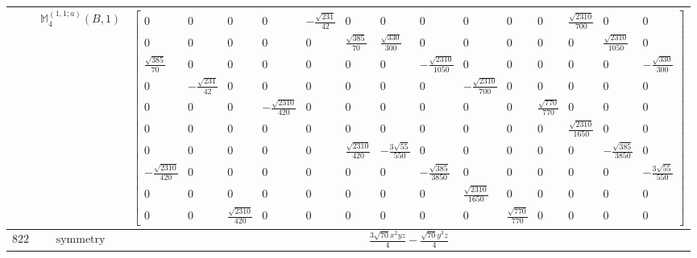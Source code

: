 \documentclass[fleqn,8pt,landscape]{jsarticle}
\begin{document}
\begin{longtable}{ccc}
$  $ & $ \mathbb{M}_{4}^{(1,1;a)}(B,1) $ & $ \begin{bmatrix} 0 & 0 & 0 & 0 & - \frac{\sqrt{231}}{42} & 0 & 0 & 0 & 0 & 0 & 0 & \frac{\sqrt{2310}}{700} & 0 & 0 \\ 0 & 0 & 0 & 0 & 0 & \frac{\sqrt{385}}{70} & \frac{\sqrt{330}}{300} & 0 & 0 & 0 & 0 & 0 & \frac{\sqrt{2310}}{1050} & 0 \\ \frac{\sqrt{385}}{70} & 0 & 0 & 0 & 0 & 0 & 0 & - \frac{\sqrt{2310}}{1050} & 0 & 0 & 0 & 0 & 0 & - \frac{\sqrt{330}}{300} \\ 0 & - \frac{\sqrt{231}}{42} & 0 & 0 & 0 & 0 & 0 & 0 & - \frac{\sqrt{2310}}{700} & 0 & 0 & 0 & 0 & 0 \\ 0 & 0 & 0 & - \frac{\sqrt{2310}}{420} & 0 & 0 & 0 & 0 & 0 & 0 & \frac{\sqrt{770}}{770} & 0 & 0 & 0 \\ 0 & 0 & 0 & 0 & 0 & 0 & 0 & 0 & 0 & 0 & 0 & \frac{\sqrt{2310}}{1650} & 0 & 0 \\ 0 & 0 & 0 & 0 & 0 & \frac{\sqrt{2310}}{420} & - \frac{3 \sqrt{55}}{550} & 0 & 0 & 0 & 0 & 0 & - \frac{\sqrt{385}}{3850} & 0 \\ - \frac{\sqrt{2310}}{420} & 0 & 0 & 0 & 0 & 0 & 0 & - \frac{\sqrt{385}}{3850} & 0 & 0 & 0 & 0 & 0 & - \frac{3 \sqrt{55}}{550} \\ 0 & 0 & 0 & 0 & 0 & 0 & 0 & 0 & \frac{\sqrt{2310}}{1650} & 0 & 0 & 0 & 0 & 0 \\ 0 & 0 & \frac{\sqrt{2310}}{420} & 0 & 0 & 0 & 0 & 0 & 0 & \frac{\sqrt{770}}{770} & 0 & 0 & 0 & 0 \end{bmatrix} $ \\ \hline
$ 822 $ & $ \text{symmetry} $ & $ \frac{3 \sqrt{70} x^{2} y z}{4} - \frac{\sqrt{70} y^{3} z}{4} $ \\

\end{longtable}
\end{document}
